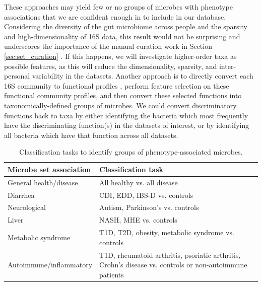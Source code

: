 \documentclass[12pt]{article}
\begin{document}
These approaches may yield few or no groups of microbes with phenotype associations
that we are confident enough in to include in our database.
Considering the diversity of the gut microbiome across people and the
sparsity and high-dimensionality of 16S data, 
this result would not be surprising and underscores the importance of the
manual curation work in Section \ref{sec:set_curation} \cite{knights-biomarkers-2011, wang-pval_method-2016}.
If this happens, we will investigate higher-order taxa as possible features,
as this will reduce the dimensionality, sparsity, and inter-personal 
variability in the datasets.
Another approach is to directly convert each 16S community to functional profiles \cite{langille-picrust-2013}, perform feature selection on these functional community profiles, and then
convert these selected functions into taxonomically-defined groups of microbes. 
We could convert discriminatory functions back to taxa
by either identifying the bacteria which most frequently have
the discriminating function(s) in the datasets of interest, or by identifying all bacteria which have that function across all datasets.
{
\renewcommand{\arraystretch}{1.2}
\begin{table}
\begin{center}
\begin{tabular}{ m{6cm} m{10cm} }
	\hline
	\textbf{Microbe set association} & \textbf{Classification task} \\
	\hline
	General health/disease & All healthy vs. all disease \\
	Diarrhea & CDI, EDD, IBS-D vs. controls \\
	Neurological & Autism, Parkinson's vs. controls \\
	Liver & NASH, MHE vs. controls\\
	Metabolic syndrome & T1D, T2D, obesity, metabolic syndrome vs. 
	controls \\
	Autoimmune/inflammatory & T1D, rheumatoid arthritis, psoriatic arthritis, Crohn's disease 
	vs. controls or non-autoimmune patients \\
	\hline
\end{tabular}
\caption{Classification tasks to identify groups of phenotype-associated microbes.}\label{tab:classifications}
\end{center}
\end{table}
}
\end{document}
